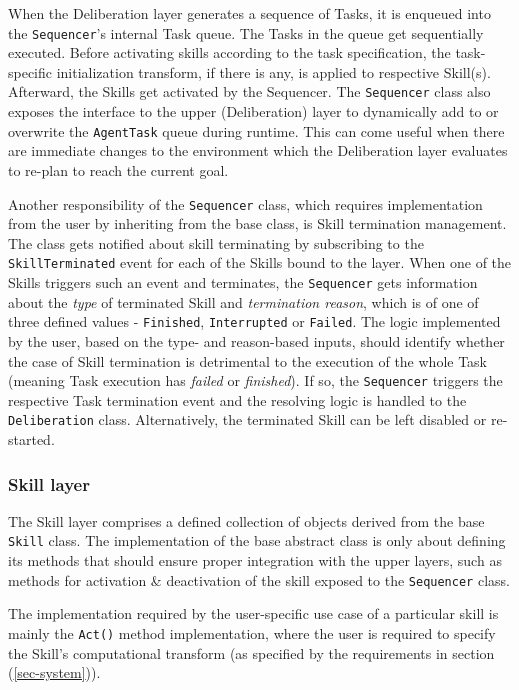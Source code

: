 \documentclass[main.tex]{subfiles}
\begin{document}
When the Deliberation layer generates a sequence of Tasks, it is enqueued into the
\texttt{Sequencer}'s internal Task queue. The Tasks in the queue get sequentially executed. 
Before activating skills according to the task specification, the task-specific 
initialization transform, if there is any, is applied to respective Skill(s). Afterward, 
the Skills get activated by the Sequencer. The \texttt{Sequencer} class also exposes the interface 
to the upper (Deliberation) layer to dynamically add to or overwrite the \texttt{AgentTask} queue 
during runtime. This can come useful when there are immediate changes to the environment which 
the Deliberation layer evaluates to re-plan to reach the current goal. 

Another responsibility of the \texttt{Sequencer} class, which requires implementation from the 
user by inheriting from the base class, is Skill termination management. The class gets notified about skill terminating
by subscribing to the \texttt{SkillTerminated} event for each of the Skills bound to the layer.
When one of the Skills triggers such an event and terminates, the \texttt{Sequencer} gets information 
about the \emph{type} of terminated Skill and \emph{termination reason}, which is of one of 
three defined values - \texttt{Finished}, \texttt{Interrupted} or \texttt{Failed}. The logic 
implemented by the user, based on the type- and reason-based inputs, should identify whether 
the case of Skill termination is detrimental to the execution of the whole Task (meaning 
Task execution has \emph{failed} or \emph{finished}). If so, the \texttt{Sequencer} triggers
the respective Task termination event and the resolving logic is handled to the \texttt{Deliberation}
class. Alternatively, the terminated Skill can be left disabled or re-started. 

\subsubsection{Skill layer}

The Skill layer comprises a defined collection of objects derived from the base
\texttt{Skill} class. The implementation of the base abstract class is only about 
defining its methods that should ensure proper integration with the upper layers, such 
as methods for activation \& deactivation of the skill exposed to the \texttt{Sequencer}
class.

The implementation required by the user-specific use case of a particular skill is mainly 
the \texttt{Act()} method implementation, where the user is required to specify the Skill's
computational transform (as specified by the requirements in section (\ref{sec-system})).
\end{document}
